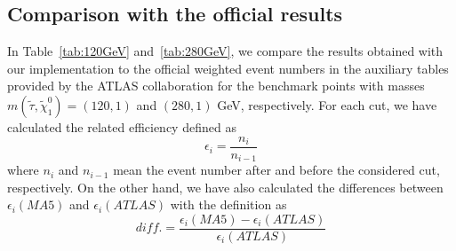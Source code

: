 \documentclass{ws-mpla}
\begin{document}
\subsection{Comparison with the official results}
In Table~\ref{tab:120GeV} and~\ref{tab:280GeV}, we compare the results obtained with our implementation to the official weighted event numbers in the auxiliary tables provided by the ATLAS collaboration for the benchmark points with masses $m(\tilde{\tau},\tilde{\chi}^0_1)=(120,1)$ and $(280,1)$ GeV, respectively.
For each cut, we have calculated the related efficiency defined as 
\begin{equation}
\epsilon_i =\frac{n_i}{n_{i-1}}
\end{equation}
where $ n_i $ and $ n_{i-1} $ mean the event number after and before the considered cut, respectively.
%
On the other hand, we have also calculated the differences between $ \epsilon_i (MA5)$ and $ \epsilon_i (ATLAS)$ with the definition as
\begin{equation}
diff. = \frac{\epsilon_i (MA5)-\epsilon_i (ATLAS)}{\epsilon_i (ATLAS)}
\end{equation}
\end{document}
